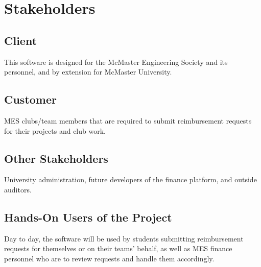 \documentclass[12pt]{article}
\begin{document}
\section{Stakeholders}
\subsection{Client}
This software is designed for the McMaster Engineering Society and its personnel, and by extension for McMaster University.

\subsection{Customer}
MES clubs/team members that are required to submit reimbursement requests for their projects and club work.

\subsection{Other Stakeholders}
University administration, future developers of the finance platform, and outside auditors.

\subsection{Hands-On Users of the Project}
Day to day, the software will be used by students submitting reimbursement requests for themselves or on their teams' behalf, as well as MES finance personnel who are to review requests and handle them accordingly.
\end{document}
